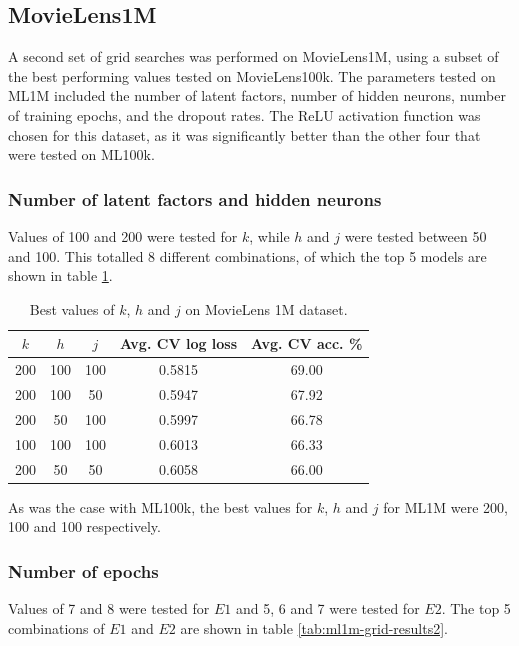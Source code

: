 \subsection{MovieLens1M}
A second set of grid searches was performed on MovieLens1M, using a subset of the best performing values tested on MovieLens100k. The parameters tested on ML1M included the number of latent factors, number of hidden neurons, number of training epochs, and the dropout rates. The ReLU activation function was chosen for this dataset, as it was significantly better than the other four that were tested on ML100k.

\subsubsection{Number of latent factors and hidden neurons}
Values of 100 and 200 were tested for $k$, while $h$ and $j$ were tested between 50 and 100. This totalled 8 different combinations, of which the top 5 models are shown in table \ref{tab:ml1m-grid-results1}.

\begin{table}[H]
\centering
\begin{tabular}{c | c | c | c | c}
\toprule
\textbf{$k$} & \textbf{$h$} & \textbf{$j$} & \textbf{Avg. CV log loss} & \textbf{Avg. CV acc.} \% \\
\midrule
200 & 100 & 100 & 0.5815 & 69.00 \\
\midrule
200 & 100 & 50 & 0.5947 & 67.92 \\
\midrule
200 & 50 & 100 & 0.5997 & 66.78 \\
\midrule
100 & 100 & 100 & 0.6013 & 66.33 \\
\midrule
200 & 50 & 50 & 0.6058 & 66.00 \\
\bottomrule
\end{tabular}
\caption[MovieLens 1M grid search results -- number of nodes]{Best values of $k$, $h$ and $j$ on MovieLens 1M dataset.}
\label{tab:ml1m-grid-results1}
\end{table}

As was the case with ML100k, the best values for $k$, $h$ and $j$ for ML1M were 200, 100 and 100 respectively.

\subsubsection{Number of epochs}
Values of 7 and 8 were tested for $E1$ and 5, 6 and 7 were tested for $E2$. The top 5 combinations of $E1$ and $E2$ are shown in table \ref{tab:ml1m-grid-results2}.

